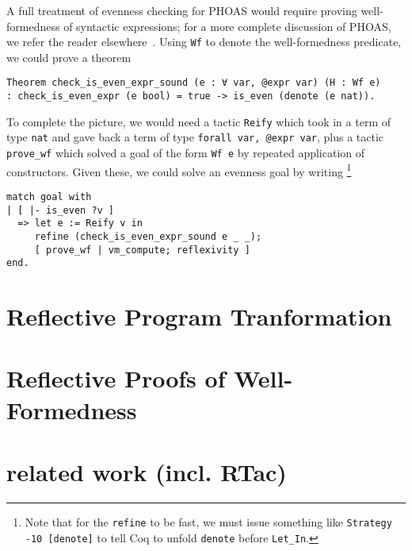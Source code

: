 A full treatment of evenness checking for PHOAS would require proving well-formedness of syntactic expressions; for a more complete discussion of PHOAS, we refer the reader elsewhere~\cite{PhoasICFP08}.
Using \texttt{Wf} to denote the well-formedness predicate, we could prove a theorem
\begin{verbatim}
Theorem check_is_even_expr_sound (e : ∀ var, @expr var) (H : Wf e)
: check_is_even_expr (e bool) = true -> is_even (denote (e nat)).
\end{verbatim}
To complete the picture, we would need a tactic \texttt{Reify} which took in a term of type \texttt{nat} and gave back a term of type \texttt{forall var, @expr var}, plus a tactic \texttt{prove_wf} which solved a goal of the form \texttt{Wf e} by repeated application of constructors.
Given these, we could solve an evenness goal by writing%
\footnote{%
  Note that for the \texttt{refine} to be fast, we must issue something like \texttt{Strategy -10 [denote]} to tell Coq to unfold \texttt{denote} before \texttt{Let_In}.
  }
\begin{verbatim}
match goal with
| [ |- is_even ?v ]
  => let e := Reify v in
     refine (check_is_even_expr_sound e _ _);
     [ prove_wf | vm_compute; reflexivity ]
end.
\end{verbatim}

\section{Reflective Program Tranformation}

\section{Reflective Proofs of Well-Formedness}

\section{related work (incl. RTac)}

